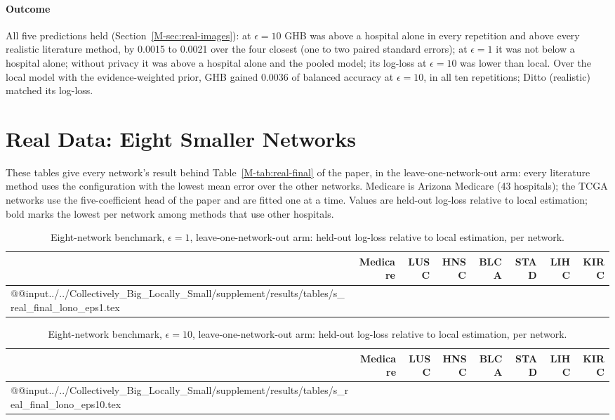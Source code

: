 \documentclass[acmsmall,screen,nonacm]{acmart}
\theoremstyle{acmdefinition}
\begin{document}
\paragraph{Outcome} All five predictions held (Section~\ref{M-sec:real-images}): at $\epsilon=10$ GHB was above a hospital alone in every repetition and above every realistic literature method, by 0.0015 to 0.0021 over the four closest (one to two paired standard errors); at $\epsilon=1$ it was not below a hospital alone; without privacy it was above a hospital alone and the pooled model; its log-loss at $\epsilon=10$ was lower than local. Over the local model with the evidence-weighted prior, GHB gained 0.0036 of balanced accuracy at $\epsilon=10$, in all ten repetitions; Ditto (realistic) matched its log-loss.

\section{Real Data: Eight Smaller Networks}\label{sec:eight}

These tables give every network's result behind Table~\ref{M-tab:real-final} of the paper, in the leave-one-network-out arm: every literature method uses the configuration with the lowest mean error over the other networks. Medicare is Arizona Medicare (43 hospitals); the TCGA networks use the five-coefficient head of the paper and are fitted one at a time. Values are held-out log-loss relative to local estimation; bold marks the lowest per network among methods that use other hospitals.

\begin{table}[t]
\caption{Eight-network benchmark, $\epsilon=1$, leave-one-network-out arm: held-out log-loss relative to local estimation, per network.}
\label{tab:eight-eps1}
\scriptsize
\setlength{\tabcolsep}{2.4pt}
\begin{tabular}{@{}lrrrrrrr@{}}
\toprule
 & Medicare & LUSC & HNSC & BLCA & STAD & LIHC & KIRC\\
\midrule
\csname @@input\endcsname ../../Collectively_Big_Locally_Small/supplement/results/tables/s_real_final_lono_eps1.tex 
\bottomrule
\end{tabular}
\end{table}

\begin{table}[t]
\caption{Eight-network benchmark, $\epsilon=10$, leave-one-network-out arm: held-out log-loss relative to local estimation, per network.}
\label{tab:eight-eps10}
\scriptsize
\setlength{\tabcolsep}{2.4pt}
\begin{tabular}{@{}lrrrrrrr@{}}
\toprule
 & Medicare & LUSC & HNSC & BLCA & STAD & LIHC & KIRC\\
\midrule
\csname @@input\endcsname ../../Collectively_Big_Locally_Small/supplement/results/tables/s_real_final_lono_eps10.tex 
\bottomrule
\end{tabular}
\end{table}
\end{document}
